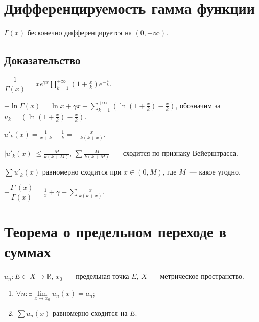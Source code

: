 \documentclass{article}
\begin{document}
    \newpage
    
    \section{Дифференцируемость гамма функции}
    
        $\Gamma(x)$ бесконечно дифференцируется на $(0, +\infty)$.
        
        \subsection{Доказательство}
        
            $\dfrac{1}{\Gamma(x)} = x e^{\gamma x} \prod\limits^{+\infty}_{k = 1} \left( 1 + \frac{x}{k} \right) e^{-\frac{x}{k}}$.
            
            $-\ln \Gamma(x) = \ln x + \gamma x + \sum\limits^{+\infty}_{k = 1} \left( \ln \left( 1 + \frac{x}{k} \right) - \frac{x}{k} \right)$, обозначим за $u_k = \left( \ln \left( 1 + \frac{x}{k} \right) - \frac{x}{k} \right)$.
            
            $u'_k(x) = \frac{1}{x + k} - \frac{1}{k} = -\frac{x}{k(k + x)}$.
            
            $| u'_k(x) | \leq \frac{M}{k (k + M)}$, $\sum \frac{M}{k (k + M)}$~--- сходится по признаку Вейерштрасса.
            
            $\sum u'_k(x)$ равномерно сходится при $x \in (0, M)$, где $M$~--- какое угодно.
            
            $- \dfrac{\Gamma'(x)}{\Gamma(x)} = \frac{1}{x} + \gamma - \sum \frac{x}{k(k + x)}$.
            
    \newpage
    
    \section{Теорема о предельном переходе в суммах}
    
        $u_n : E \subset X \rightarrow \mathbb{R}$, $x_0$~--- предельная точка $E$, $X$~--- метрическое пространство.
        
        \begin{enumerate}
        
            \item $\forall n : \exists \lim\limits_{x \rightarrow x_0} u_n(x) = a_n$;
            
            \item $\sum u_n(x)$ равномерно сходится на $E$.
        
        \end{enumerate}
        
\end{document}
